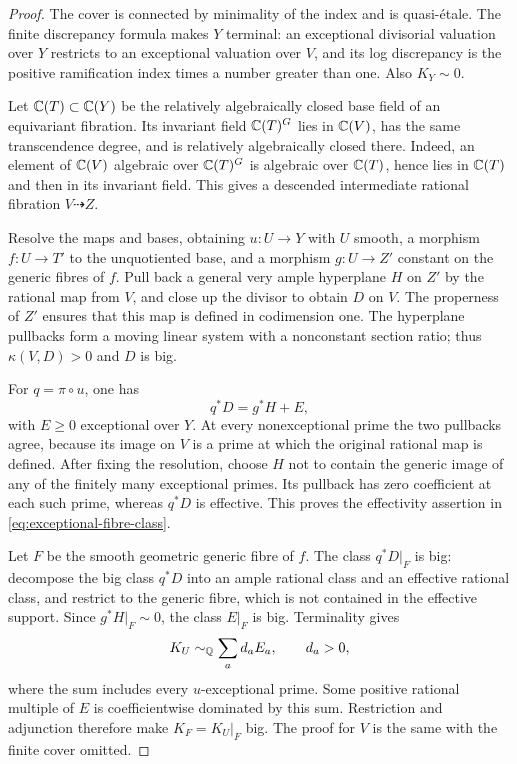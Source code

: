 \begin{proof}
The cover is connected by minimality of the index and is quasi-\'etale.
The finite discrepancy formula makes $Y$ terminal: an exceptional
divisorial valuation over $Y$ restricts to an exceptional valuation
over $V$, and its log discrepancy is the positive ramification index
times a number greater than one.  Also $K_Y\sim0$.

Let $\mathbb C(T)\subset\mathbb C(Y)$ be the relatively algebraically closed
base field of an equivariant fibration.  Its invariant field
$\mathbb C(T)^G$ lies in $\mathbb C(V)$, has the same transcendence degree, and
is relatively algebraically closed there.  Indeed, an element of
$\mathbb C(V)$ algebraic over $\mathbb C(T)^G$ is algebraic over $\mathbb C(T)$, hence
lies in $\mathbb C(T)$ and then in its invariant field.  This gives a
descended intermediate rational fibration $V\dashrightarrow Z$.

Resolve the maps and bases, obtaining $u:U\to Y$ with $U$ smooth,
a morphism $f:U\to T'$ to the unquotiented base, and a morphism
$g:U\to Z'$ constant on the generic fibres of $f$.  Pull back a
general very ample hyperplane $H$ on $Z'$ by the rational map from
$V$, and close up the divisor to obtain $D$ on $V$.  The properness
of $Z'$ ensures that this map is defined in codimension one.  The
hyperplane pullbacks form a moving linear system with a nonconstant
section ratio; thus $\kappa(V,D)>0$ and $D$ is big.

For $q=\pi\circ u$, one has
\begin{equation}\label{eq:exceptional-fibre-class}
                              q^*D=g^*H+E,
\end{equation}
with $E\ge0$ exceptional over $Y$.  At every nonexceptional prime
the two pullbacks agree, because its image on $V$ is a prime at
which the original rational map is defined.  After fixing the
resolution, choose $H$ not to contain the generic image of any of
the finitely many exceptional primes.  Its pullback has zero
coefficient at each such prime, whereas $q^*D$ is effective.  This
proves the effectivity assertion in
\eqref{eq:exceptional-fibre-class}.

Let $F$ be the smooth geometric generic fibre of $f$.  The class
$q^*D|_F$ is big: decompose the big class $q^*D$ into an ample
rational class and an effective rational class, and restrict to the
generic fibre, which is not contained in the effective support.
Since $g^*H|_F\sim0$, the class $E|_F$ is big.  Terminality gives
\[
                         K_U\sim_{\mathbb Q}\sum_a d_a E_a,
                         \qquad d_a>0,
\]
where the sum includes every $u$-exceptional prime.  Some positive
rational multiple of $E$ is coefficientwise dominated by this sum.
Restriction and adjunction therefore make $K_F=K_U|_F$ big.  The
proof for $V$ is the same with the finite cover omitted.
\end{proof}


